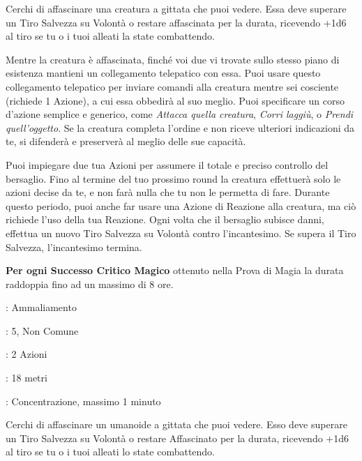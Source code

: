 \begin{multicols}{2}
Cerchi di affascinare una creatura a gittata che puoi vedere. Essa deve superare un Tiro Salvezza su Volontà o restare affascinata per la durata, ricevendo +1d6 al tiro se tu o i tuoi alleati la state combattendo.

Mentre la creatura è affascinata, finché voi due vi trovate sullo stesso piano di esistenza mantieni un collegamento telepatico con essa. Puoi usare questo collegamento telepatico per inviare comandi alla creatura mentre sei cosciente (richiede 1 Azione), a cui essa obbedirà al suo meglio. Puoi specificare un corso d'azione semplice e generico, come \emph{Attacca quella creatura}, \emph{Corri laggiù}, o \emph{Prendi quell'oggetto}. Se la creatura completa l'ordine e non riceve ulteriori indicazioni da te, si difenderà e preserverà al meglio delle sue capacità.

Puoi impiegare due tua Azioni per assumere il totale e preciso controllo del bersaglio. Fino al termine del tuo prossimo round la creatura effettuerà solo le azioni decise da te, e non farà nulla che tu non le permetta di fare. Durante questo periodo, puoi anche far usare una Azione di Reazione alla creatura, ma ciò richiede l'uso della tua Reazione. Ogni volta che il bersaglio subisce danni, effettua un nuovo Tiro Salvezza su Volontà contro l'incantesimo. Se supera il Tiro Salvezza, l'incantesimo termina.

\textbf{Per ogni Successo Critico Magico} ottenuto nella Prova di Magia la durata raddoppia fino ad un massimo di 8 ore.

\noindent\colorbox{OBSSgold!10}{
\begin{minipage}{0.95\linewidth}
\begin{description}[noitemsep, topsep=0pt, parsep=0pt, partopsep=0pt, leftmargin=0cm, labelwidth=1.3cm]
	\item[\textbf{Lista}]: Ammaliamento
	\item[\textbf{Livello}]: 5, Non Comune
	\item[\textbf{Lancio}]: 2 Azioni
	\item[\textbf{Gittata}]: 18 metri
	\item[\textbf{Durata}]: Concentrazione, massimo 1 minuto
\end{description}
\end{minipage}}\smallskip

Cerchi di affascinare un umanoide a gittata che puoi vedere. Esso deve superare un Tiro Salvezza su Volontà o restare Affascinato per la durata, ricevendo +1d6 al tiro se tu o i tuoi alleati lo state combattendo.


\end{multicols}
